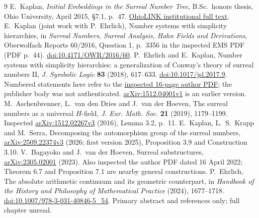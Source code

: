 \documentclass[11pt]{article}
\begin{document}
\begin{thebibliography}{9}
E.~Kaplan, \emph{Initial Embeddings in the Surreal Number Tree},
B.Sc.\ honors thesis, Ohio University, April 2015, \S7.1, p.~47.
\href{https://etd.ohiolink.edu/acprod/odb_etd/ws/send_file/send?accession=ouhonors1429615758&disposition=inline}{OhioLINK institutional full text}.
E.~Kaplan (joint work with P.~Ehrlich), Number systems with simplicity
hierarchies, in \emph{Surreal Numbers, Surreal Analysis, Hahn Fields and
Derivations}, Oberwolfach Reports 60/2016, Question 1, p.~3356
in the inspected EMS PDF (PDF p.~44).
\href{https://doi.org/10.4171/OWR/2016/60}{doi:10.4171/OWR/2016/60}.
P.~Ehrlich and E.~Kaplan, Number systems with simplicity hierarchies:
a generalization of Conway's theory of surreal numbers II,
\emph{J. Symbolic Logic} \textbf{83} (2018), 617--633.
\href{https://doi.org/10.1017/jsl.2017.9}{doi:10.1017/jsl.2017.9}.
Numbered statements here refer to the
\href{https://elliotakaplan.github.io/Number_systems_with_simplicity_hierarchies_II.pdf}{inspected 16-page author PDF};
the publisher body was not authenticated.
\href{https://arxiv.org/abs/1512.04001v1}{arXiv:1512.04001v1} is an earlier version.
M.~Aschenbrenner, L.~van den Dries and J.~van der Hoeven,
The surreal numbers as a universal $H$-field,
\emph{J. Eur. Math. Soc.} \textbf{21} (2019), 1179--1199.
Inspected \href{https://arxiv.org/abs/1512.02267v3}{arXiv:1512.02267v3}
(2016), Lemma 3.2, p.~11.
E.~Kaplan, L.~S.~Krapp and M.~Serra,
Decomposing the automorphism group of the surreal numbers,
\href{https://arxiv.org/abs/2509.22374v3}{arXiv:2509.22374v3}
(2026; first version 2025), Proposition 3.9 and Construction 3.10.
V.~Bagayoko and J.~van der Hoeven, Surreal substructures,
\href{https://arxiv.org/abs/2305.02001}{arXiv:2305.02001} (2023).
Also inspected the author PDF dated 16 April 2022;
Theorem 6.7 and Proposition 7.1 are nearby general constructions.
P.~Ehrlich, The absolute arithmetic continuum and its geometric
counterpart, in \emph{Handbook of the History and Philosophy of
Mathematical Practice} (2024), 1677--1718.
\href{https://doi.org/10.1007/978-3-031-40846-5_54}{doi:10.1007/978-3-031-40846-5\_54}.
Primary abstract and references only; full chapter unread.
\end{thebibliography}
\end{document}
